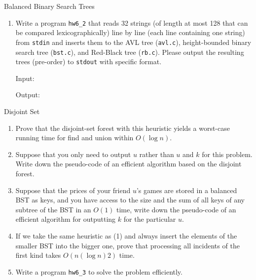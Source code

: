 \begin{homeworkProblem}{Balanced Binary Search Trees}
    \begin{enumerate}[label=(\arabic*)]
        \item
            Write a program \texttt{hw6\_2} that reads 32 strings (of length at
            most 128 that can be compared lexicographically) line by line (each 
            line containing one string) from \texttt{stdin} and inserts them to
            the AVL tree (\texttt{avl.c}), height-bounded binary search tree 
            (\texttt{bst.c}), and Red-Black tree (\texttt{rb.c}). Please output
            the resulting trees (pre-order) to \texttt{stdout} with specific
            format. 

            Input:
            

            Output:
            

    \end{enumerate}
\end{homeworkProblem}

\begin{homeworkProblem}{Disjoint Set}
    \begin{enumerate}[label=(\arabic*)]
        \item
            Prove that the disjoint-set forest with this heuristic yields a 
            worst-case running time for find and union within $O(\log n)$.

            \pending

        \item
            Suppose that you only need to output $u$ rather than $u$ and $k$ for
            this problem. Write down the pseudo-code of an efficient algorithm
            based on the disjoint forest.

            \pending

        \item
            Suppose that the prices of your friend $u$'s games are stored in a
            balanced BST as keys, and you have access to the size and the sum of
            all keys of any subtree of the BST in an $O(1)$ time, write down the
            pseudo-code of an efficient algorithm for outputting $k$ for the 
            particular $u$.

            \pending

        \item
            If we take the same heuristic as (1) and always insert the elements
            of the smaller BST into the bigger one, prove that processing all
            incidents of the first kind takes $O(n(\log n) 2)$ time.

            \pending

        \item Write a program \texttt{hw6\_3} to solve the problem efficiently.


    \end{enumerate}
\end{homeworkProblem}


